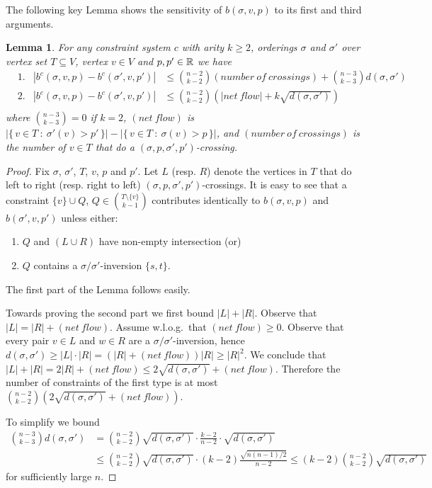 \documentclass[dvips,11pt,letter]{article}
\newcommand{\set}[1]{\{#1\}}                        \newcommand{\setof}[2]{\{\,{#1}\::\:{#2}\,\}}        \newcommand{\groupFrac}[2]{\left(\frac{#1}{#2}\right)}
\newcommand{\sm}{\setminus} \newcommand{\compl}[1]{\overline{#1}}                \newcommand{\floor}[1]{\left\lfloor #1 \right\rfloor}
\newtheorem{lemma}[theorem]{Lemma}
\begin{document}
The following key Lemma shows the sensitivity of $b(\sigma,v,p)$ to its first and third arguments.
\begin{lemma}\label{lem:bChangeFirst}
For any constraint system $c$ with arity $k \ge 2$, orderings $\sigma$ and $\sigma'$ over vertex set $T \subseteq V$, vertex $v \in V$ and $p,p' \in \mathbb{R}$ we have
\begin{align*}
&1.&|b^c(\sigma, v, p) - b^c(\sigma', v, p')|
&\le \binom{n-2}{k-2} (number\ of\ crossings) + \binom{n-3}{k-3} d(\sigma, \sigma')\\
&2.&|b^c(\sigma, v, p) - b^c(\sigma', v, p')|
&\le \binom{n-2}{k-2} \left(|net\ flow| + k \sqrt{d(\sigma, \sigma')}\right) \\
\end{align*}
where $\binom{n-3}{k-3}=0$ if $k=2$, $(net\ flow)$ is $|\setof{v \in T}{\sigma'(v) > p'}| - |\setof{v \in T}{\sigma(v) > p}|$, and $(number\ of\ crossings)$ is the number of $v \in T$ that do a $(\sigma,p,\sigma',p')$-crossing.
\end{lemma}
\begin{proof}
Fix $\sigma$, $\sigma'$, $T$, $v$, $p$ and $p'$. Let $L$ (resp. $R$) denote the vertices in $T$ that do left to right (resp. right to left) $(\sigma,p,\sigma',p')$-crossings. It is easy to see that a constraint $\set{v} \cup Q$, $Q \in \binom{T \sm \set{v}}{k-1}$ contributes identically to $b(\sigma, v, p)$ and $b(\sigma', v, p')$ unless either:
\begin{enumerate}
\item $Q$ and $(L \cup R)$ have non-empty intersection (or)
\item $Q$ contains a $\sigma/\sigma'$-inversion $\set{s,t}$.
\end{enumerate}
The first part of the Lemma follows easily.

Towards proving the second part we first bound $|L|+|R|$. Observe that $|L| = |R| + (net\ flow)$. Assume w.l.o.g.\ that $(net\ flow) \ge 0$. Observe that every pair $v \in L$ and $w \in R$ are a $\sigma/\sigma'$-inversion, hence
$d(\sigma,\sigma') \ge |L|\cdot|R| = (|R| + (net\ flow))|R| \ge |R|^2$. We conclude that $|L| + |R| = 2|R| + (net\ flow) \le 2\sqrt{d(\sigma,\sigma')} + (net\ flow)$. Therefore the number of constraints of the first type is at most $\binom{n-2}{k-2}(2\sqrt{d(\sigma,\sigma')} + (net\ flow))$.

To simplify we bound
\begin{align*}
\binom{n-3}{k-3}d(\sigma,\sigma') &=\binom{n-2}{k-2}\sqrt{d(\sigma,\sigma')}\cdot \frac{k-2}{n-2} \cdot \sqrt{d(\sigma,\sigma')} \\
&\le \binom{n-2}{k-2}\sqrt{d(\sigma,\sigma')} \cdot (k-2)\frac{\sqrt{n(n-1)/2} }{n-2} \le (k-2)\binom{n-2}{k-2}\sqrt{d(\sigma,\sigma')}
\end{align*}
for sufficiently large $n$.
\end{proof}
\end{document}
